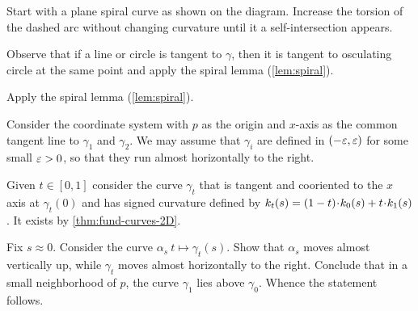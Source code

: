  Start with a plane spiral curve as shown on the diagram.
Increase the torsion of the dashed arc without changing curvature until it a self-intersection appears.

Observe that if a line or circle is tangent to $\gamma$,
then it is tangent to osculating circle at the same point
and apply the spiral lemma (\ref{lem:spiral}).




Apply the spiral lemma (\ref{lem:spiral}).

 Consider the coordinate system with $p$ as the origin and $x$-axis as the common tangent line to $\gamma_1$ and $\gamma_2$.
We may assume that $\gamma_i$ are defined in $(-\varepsilon,\varepsilon)$ for some small $\varepsilon>0$,
so that they run almost horizontally to the right.

Given $t\in[0,1]$ consider the curve $\gamma_t$ that is tangent and cooriented to the $x$ axis at  $\gamma_t(0)$ and has signed curvature defined by $\skur_t(s)=(1-t)\cdot\skur_0(s)+t\cdot\skur_1(s)$.
It exists by \ref{thm:fund-curves-2D}.

Fix $s\approx 0$.
Consider the curve $\alpha_s\:t\mapsto \gamma_t(s)$.
Show that $\alpha_s$ moves almost vertically up, while $\gamma_t$ moves almost horizontally to the right.
Conclude that in a small neighborhood of $p$, the curve $\gamma_1$
lies above $\gamma_0$.
Whence the statement follows.

